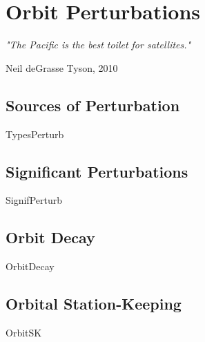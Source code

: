 \chapter{Orbit Perturbations}\label{ch:Pert}
\label{ch:Pert}
\epigraph{\textit{"The Pacific is the best toilet for satellites."}}{Neil deGrasse Tyson, 2010} 
\newpage
\section{Sources of Perturbation}
{TypesPerturb}

\section{Significant Perturbations}
{SignifPerturb}

\section{Orbit Decay}
{OrbitDecay}

\section{Orbital Station-Keeping}
{OrbitSK}
